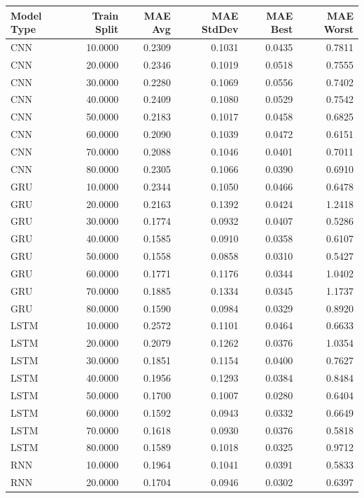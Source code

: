 \begin{tabular}{lrrrrr}
\toprule
Model Type & Train Split & MAE Avg & MAE StdDev & MAE Best & MAE Worst \\
\midrule
CNN & 10.0000 & 0.2309 & 0.1031 & 0.0435 & 0.7811 \\
CNN & 20.0000 & 0.2346 & 0.1019 & 0.0518 & 0.7555 \\
CNN & 30.0000 & 0.2280 & 0.1069 & 0.0556 & 0.7402 \\
CNN & 40.0000 & 0.2409 & 0.1080 & 0.0529 & 0.7542 \\
CNN & 50.0000 & 0.2183 & 0.1017 & 0.0458 & 0.6825 \\
CNN & 60.0000 & 0.2090 & 0.1039 & 0.0472 & 0.6151 \\
CNN & 70.0000 & 0.2088 & 0.1046 & 0.0401 & 0.7011 \\
CNN & 80.0000 & 0.2305 & 0.1066 & 0.0390 & 0.6910 \\
GRU & 10.0000 & 0.2344 & 0.1050 & 0.0466 & 0.6478 \\
GRU & 20.0000 & 0.2163 & 0.1392 & 0.0424 & 1.2418 \\
GRU & 30.0000 & 0.1774 & 0.0932 & 0.0407 & 0.5286 \\
GRU & 40.0000 & 0.1585 & 0.0910 & 0.0358 & 0.6107 \\
GRU & 50.0000 & 0.1558 & 0.0858 & 0.0310 & 0.5427 \\
GRU & 60.0000 & 0.1771 & 0.1176 & 0.0344 & 1.0402 \\
GRU & 70.0000 & 0.1885 & 0.1334 & 0.0345 & 1.1737 \\
GRU & 80.0000 & 0.1590 & 0.0984 & 0.0329 & 0.8920 \\
LSTM & 10.0000 & 0.2572 & 0.1101 & 0.0464 & 0.6633 \\
LSTM & 20.0000 & 0.2079 & 0.1262 & 0.0376 & 1.0354 \\
LSTM & 30.0000 & 0.1851 & 0.1154 & 0.0400 & 0.7627 \\
LSTM & 40.0000 & 0.1956 & 0.1293 & 0.0384 & 0.8484 \\
LSTM & 50.0000 & 0.1700 & 0.1007 & 0.0280 & 0.6404 \\
LSTM & 60.0000 & 0.1592 & 0.0943 & 0.0332 & 0.6649 \\
LSTM & 70.0000 & 0.1618 & 0.0930 & 0.0376 & 0.5818 \\
LSTM & 80.0000 & 0.1589 & 0.1018 & 0.0325 & 0.9712 \\
RNN & 10.0000 & 0.1964 & 0.1041 & 0.0391 & 0.5833 \\
RNN & 20.0000 & 0.1704 & 0.0946 & 0.0302 & 0.6397 \\

\end{tabular}
